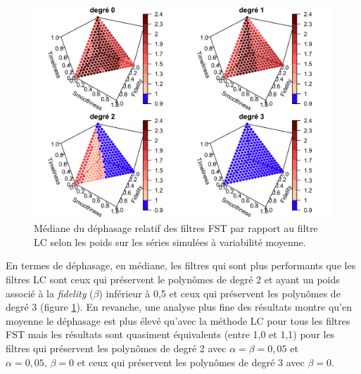 \documentclass[
  12pt,
  a4paper,french]{article}
\newcommand\1{\mathds{1}}
\begin{document}
\begin{figure}

{\centering \includegraphics[width=0.9\linewidth]{img/simulations/fst_mediumvariability_tp_med} 

}

\caption[Médiane du déphasage relatif des filtres FST par rapport au filtre LC selon les poids sur les séries simulées à variabilité moyenne]{Médiane du déphasage relatif des filtres FST par rapport au filtre LC selon les poids sur les séries simulées à variabilité moyenne.}\label{fig:graphstpsimulfst}

\footnotesize
\normalsize\end{figure}

En termes de déphasage, en médiane, les filtres qui sont plus performants que les filtres LC sont ceux qui préservent le polynômes de degré 2 et ayant un poids associé à la \emph{fidelity} (\(\beta\)) inférieur à 0,5 et ceux qui préservent les polynômes de degré 3 (figure \ref{fig:graphstpsimulfst}).
En revanche, une analyse plus fine des résultats montre qu'en moyenne le déphasage est plus élevé qu'avec la méthode LC pour tous les filtres FST mais les résultats sont quasiment équivalents (entre 1,0 et 1,1) pour les filtres qui préservent les polynômes de degré 2 avec \(\alpha = \beta =0,05\) et \(\alpha = 0,05, \, \beta =0\) et ceux qui préservent les polynômes de degré 3 avec \(\beta=0\).
\end{document}
